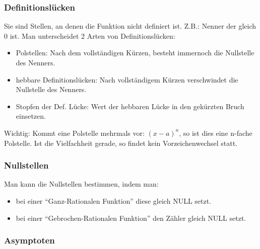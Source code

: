 \subsubsection*{Definitionslücken}

Sie sind Stellen, an denen die Funktion nicht definiert ist. Z.B.:
Nenner der gleich 0 ist. Man unterscheidet 2 Arten von Definitionslücken:
\begin{itemize}
\item Polstellen: Nach dem vollständigen Kürzen, besteht immernoch die Nullstelle
des Nenners.
\item hebbare Definitionslücken: Nach vollständigem Kürzen verschwindet
die Nullstelle des Nenners.
\item Stopfen der Def. Lücke: Wert der hebbaren Lücke in den gekürzten Bruch
einsetzen. 
\end{itemize}
Wichtig: Kommt eine Polstelle mehrmals vor: $(x-a)^{n}$, so ist dies
eine n-fache Polstelle. Ist die Vielfachheit gerade, so findet kein
Vorzeichenwechsel statt.


\subsubsection*{Nullstellen}

Man kann die Nullstellen bestimmen, indem man:
\begin{itemize}
\item bei einer ``Ganz-Rationalen Funktion'' diese gleich NULL setzt.
\item bei einer ``Gebrochen-Rationalen Funktion'' den Zähler gleich NULL
setzt.
\end{itemize}

\subsubsection*{Asymptoten}

